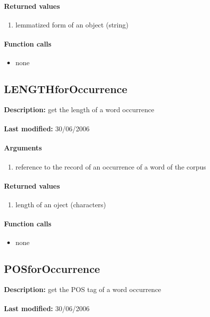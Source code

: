 \paragraph{Returned values}
\begin{enumerate}
\item lemmatized form of an object (string)
\end{enumerate}

\paragraph{Function calls}
\begin{itemize}
\item none
\end{itemize}

\subsection{LENGTHforOccurrence}
\textbf{Description:} get the length of a word occurrence\\
\\\textbf{Last modified:} 30/06/2006

\paragraph{Arguments}
\begin{enumerate}
\item reference to the record of an occurrence of a word of the corpus
\end{enumerate}

\paragraph{Returned values}
\begin{enumerate}
\item length of an oject (characters)
\end{enumerate}

\paragraph{Function calls}
\begin{itemize}
\item none
\end{itemize}

\subsection{POSforOccurrence}
\textbf{Description:} get the POS tag of a word occurrence\\
\\\textbf{Last modified:} 30/06/2006

